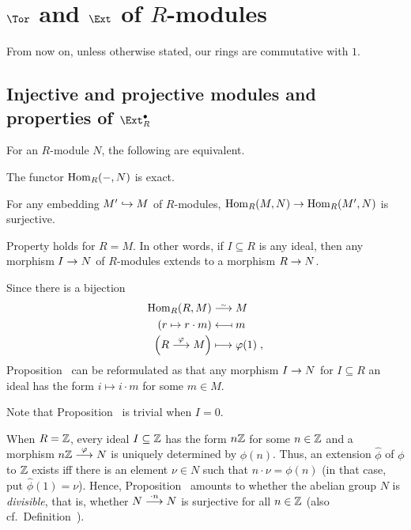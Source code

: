 \documentclass[a4paper,parskip=half,numbers=enddot, DIV=12]{scrreprt}
\begin{document}
\chapter{\texorpdfstring{$\Tor$}{Tor} and \texorpdfstring{$\Ext$}{Ext} of \texorpdfstring{$R$}{R}-modules}
From now on, unless otherwise stated, our rings are commutative with $1$.
\section{Injective and projective modules and properties of \texorpdfstring{$\Ext_R^\bullet $}{Ext}}
\begin{prop}
	For an $R$-module $N$, the following are equivalent.
	\begin{alphanumerate}
		\item The functor $\operatorname{Hom}_R(-,N)$ is exact.
		\item For any embedding $M'\monomorphism M$ of $R$-modules, $\Hom_R(M,N)\morphism\Hom_R(M',N)$ is surjective.
		\item Property  holds for $R=M$. In other words, if $I\subseteq R$ is any ideal, then any morphism $I\morphism N$ of $R$-modules extends to a morphism $R\morphism N$.
	\end{alphanumerate}
\end{prop}
\begin{rem}
	\begin{alphanumerate}
		\item {}Since there is a bijection
		\begin{align*}
			\Hom_R(R,M)&\isomorphism M\\
			\left(r\mapsto r\cdot m\right)&\longmapsfrom m\\
			\left(R\morphism[\phi]M\right)&\longmapsto \phi(1)\;,
		\end{align*}
		Proposition~ can be reformulated as that any morphism $I\morphism N$ for $I\subseteq R$ an ideal has the form $i\mapsto i\cdot m$ for some $m\in M$.
		\item Note that Proposition~ is trivial when $I=0$.
		\item When $R=\mathbb{Z}$, every ideal $I\subseteq \mathbb{Z}$ has the form $n\mathbb{Z}$ for some $n\in\mathbb{Z}$ and a morphism $n\IZ\morphism[\phi]N$ is uniquely determined by $\phi(n)$. Thus, an extension $\hat\phi$ of $\phi$ to $\mathbb{Z}$ exists iff there is an element $\nu\in N$ such that $n\cdot\nu=\phi(n)$ (in that case, put $\hat\phi(1)=\nu$). Hence, Proposition~  amounts to whether the abelian group $N$ is \emph{divisible}, that is, whether $N\morphism[\cdot n]N$ is surjective for all $n\in\mathbb{Z}$ (also cf.\ Definition~\reff{def:Divisible}).
	\end{alphanumerate}
\end{rem}
\end{document}
